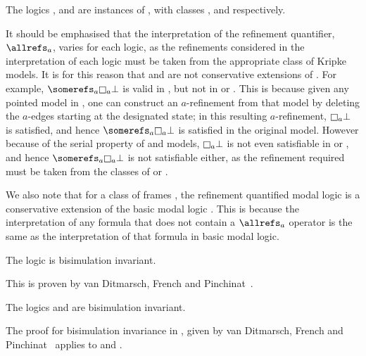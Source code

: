 The logics \logicKF{}, \logicKDF{} and \logicSF{} are instances of \logicCF{},
with classes \classK{}, \classKD{} and \classS{} respectively. 

It should be emphasised that the interpretation of the refinement quantifier,
$\allrefs_a$, varies for each logic, as the refinements considered in the
interpretation of each logic must be taken from the appropriate class of Kripke
models. It is for this reason that \logicSF{} and \logicKDF{} are not
conservative extensions of \logicKF{}. For example, $\somerefs_a \knows_a \bot$
is valid in \logicKF{}, but not in \logicSF{} or \logicKDF{}. This is because
given any pointed model in \classK{}, one can construct an $a$-refinement from
that model by deleting the $a$-edges starting at the designated state; in this
resulting $a$-refinement, $\knows_a \bot$ is satisfied, and hence $\somerefs_a
\knows_a \bot$ is satisfied in the original model. However because of the serial
property of \classS{} and \classKD{} models, $\knows_a \bot$ is not even
satisfiable in \logicSF{} or \logicKDF{}, and hence $\somerefs_a \knows_a \bot$
is not satisfiable either, as the refinement required must be taken from the
classes of \classS{} or \classKD{}.

We also note that for a class of frames \classC{}, the refinement quantified
modal logic \logicCF{} is a conservative extension of the basic modal logic
\logicC{}. This is because the interpretation of any formula that does not
contain a $\allrefs_a$ operator is the same as the interpretation of that
formula in basic modal logic.

\begin{lemma}
The logic \logicKF{} is bisimulation invariant.
\end{lemma}

This is proven by van Ditmarsch, French and Pinchinat~\cite{french2010future}.

\begin{lemma}
The logics \logicKDF{} and \logicSF{} are bisimulation invariant.
\end{lemma}

The proof for bisimulation invariance in \logicKF{}, given by van Ditmarsch,
French and Pinchinat~\cite{french2010future} applies to \logicSF{} and
\logicKDF{}.

